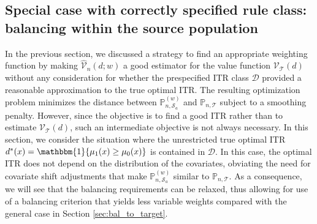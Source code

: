 \documentclass[12pt]{article}
\newcommand{\prob}{\mathbb{P}}
\newcommand{\ind}{\mathbbm{1}}
\begin{document}
\subsection{Special case with correctly specified rule class: balancing within the source population}
\label{sec:bal_trt_ctrl}
In the previous section, we discussed a strategy to find an appropriate weighting function by making $\widehat{\mathcal{V}}_n(d; w)$ a good estimator for the value function $\mathcal{V}_\mathcal{T}(d)$ without any consideration for whether the prespecified ITR class $\mathcal{D}$ provided a reasonable approximation to the true optimal ITR. The resulting optimization problem minimizes the distance between $\prob_{n,\mathcal{S}_a}^{(w)}$ and $\prob_{n,\mathcal{T}}$ subject to a smoothing penalty. However, since the objective is to find a good ITR rather than to estimate $\mathcal{V}_\mathcal{T}(d)$, such an intermediate objective is not always necessary. In this section, we consider the situation where the unrestricted true optimal ITR $d^*(x) = \ind \{\mu_1(x) \ge \mu_0(x) \}$ is contained in $\mathcal{D}$. In this case, the optimal ITR does not depend on the distribution of the covariates, obviating the need for covariate shift adjustments that make $\prob_{n,\mathcal{S}_a}^{(w)}$ similar to $\prob_{n,\mathcal{T}}$. As a consequence, we will see that the balancing requirements can be relaxed, thus allowing for use of a balancing criterion that yields less variable weights compared with the general case in Section \ref{sec:bal_to_target}.
\end{document}
